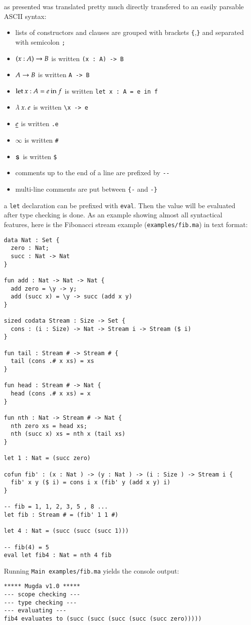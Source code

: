 \mugda as presented was translated pretty much directly transfered to an easily parsable ASCII syntax:
\begin{itemize}
\item
lists of constructors and clauses are grouped with brackets \texttt{\{},\texttt{\}} and separated with semicolon \texttt{;}
\item
$( x : A ) \rightarrow{B}$ is written \texttt{(x : A) -> B }
\item
$A \rightarrow B$ is written \texttt{A -> B}
\item
$\mathrm{let}\: x : A = e \: \mathrm{in}\:{f}$ is written \texttt{let x : A = e in f}
\item
$ \lambda\: x .\:e$ is written \verb+\x -> e +
\item
$ \underline{e}$ is written \texttt{.e} 
\item
$ \infty$ is written \texttt{\#} 
\item
$\mathsf{s}\,$ is written \texttt{\$}
\item
comments up to the end of a line are prefixed by \verb+--+
\item
multi-line comments are put between \verb+{-+ and \verb+-}+
\end{itemize}
a \texttt{let} declaration can be prefixed with \texttt{eval}. Then the value will be evaluated after type checking is done.
As an example showing almost all syntactical features, here is the Fibonacci stream example (\texttt{examples/fib.ma}) in text format:
\begin{verbatim}
data Nat : Set {
  zero : Nat;
  succ : Nat -> Nat 
}

fun add : Nat -> Nat -> Nat {
  add zero = \y -> y;
  add (succ x) = \y -> succ (add x y)
}

sized codata Stream : Size -> Set {
  cons : (i : Size) -> Nat -> Stream i -> Stream ($ i)
}
 
fun tail : Stream # -> Stream # {
  tail (cons .# x xs) = xs
}

fun head : Stream # -> Nat {
  head (cons .# x xs) = x
}

fun nth : Nat -> Stream # -> Nat {
  nth zero xs = head xs;
  nth (succ x) xs = nth x (tail xs) 
}

let 1 : Nat = (succ zero)

cofun fib' : (x : Nat ) -> (y : Nat ) -> (i : Size ) -> Stream i {
  fib' x y ($ i) = cons i x (fib' y (add x y) i)
} 

-- fib = 1, 1, 2, 3, 5 , 8 ...
let fib : Stream # = (fib' 1 1 #)

let 4 : Nat = (succ (succ (succ 1)))

-- fib(4) = 5 
eval let fib4 : Nat = nth 4 fib 
\end{verbatim}
Running \texttt{Main examples/fib.ma} yields the console output:
\begin{verbatim}
***** Mugda v1.0 *****
--- scope checking ---
--- type checking ---
--- evaluating ---
fib4 evaluates to (succ (succ (succ (succ (succ zero)))))
\end{verbatim}

